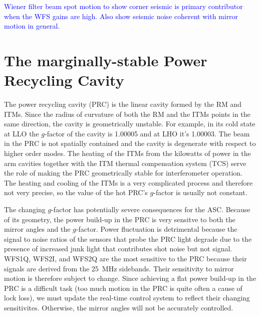 \textcolor{blue}{Wiener filter beam spot motion to show corner seismic is primary
contributor when the WFS gains are high. Also show seismic noise 
coherent with mirror motion in general.}



\section{The marginally-stable Power Recycling Cavity}
The power recycling cavity (PRC) is the linear cavity formed by the RM
and ITMs. Since the radius of curvature of both the RM and the ITMs
points in the same direction, the cavity is geometrically
unstable. For example, in its cold state at LLO the $g$-factor of the
cavity is 1.00005 and at LHO it's 1.00003. The beam in the PRC is not
spatially contained and the cavity is degenerate with respect to
higher order modes. The heating of the ITMs from the kilowatts of
power in the arm cavities together with the ITM thermal compensation
system (TCS) serve the role of making the PRC geometrically stable for
interferometer operation. The heating and cooling of the ITMs is a
very complicated process and therefore not very precise, so the value
of the hot PRC's $g$-factor is usually not constant.

The changing $g$-factor has potentially severe consequences for the
ASC. Because of its geometry, the power build-up in the PRC is very
sensitve to both the mirror angles and the $g$-factor. Power
fluctuation is detrimental because the signal to noise ratios of the
sensors that probe the PRC light degrade due to the presence of
increased junk light that contributes shot noise but not
signal. WFS1Q, WFS2I, and WFS2Q are the most sensitive to the PRC
because their signals are derived from the 25~MHz sidebands. Their
sensitivity to mirror motion is therefore subject to change. Since
achieving a flat power build-up in the PRC is a difficult task (too
much motion in the PRC is quite often a cause of lock loss), we must
update the real-time control system to reflect their changing
sensitivites. Otherwise, the mirror angles will not be accurately
controlled.

